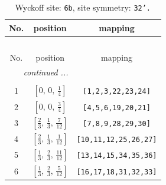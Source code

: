 \documentclass[fleqn,8pt]{jsarticle}
\begin{document}
\begin{longtable}{ccc}
\caption{Wyckoff site: {\tt 6b}, site symmetry: {\tt 32'.}}
 \\
 \hline \hline
No. & position & mapping \\ \hline \endfirsthead

\multicolumn{2}{l}{\tablename\ \thetable{}} \\
 \hline \hline
No. & position & mapping \\ \hline \endhead

 \hline \hline
\multicolumn{2}{r}{\footnotesize\it continued ...} \\ \endfoot

 \hline \hline
\multicolumn{2}{r}{} \\ \endlastfoot

1 & $\left[ 0,\, 0,\, \frac{1}{4} \right]$ & {\tt [1,2,3,22,23,24]} \\ \hline
2 & $\left[ 0,\, 0,\, \frac{3}{4} \right]$ & {\tt [4,5,6,19,20,21]} \\ \hline
3 & $\left[ \frac{2}{3},\, \frac{1}{3},\, \frac{7}{12} \right]$ & {\tt [7,8,9,28,29,30]} \\ \hline
4 & $\left[ \frac{2}{3},\, \frac{1}{3},\, \frac{1}{12} \right]$ & {\tt [10,11,12,25,26,27]} \\ \hline
5 & $\left[ \frac{1}{3},\, \frac{2}{3},\, \frac{11}{12} \right]$ & {\tt [13,14,15,34,35,36]} \\ \hline
6 & $\left[ \frac{1}{3},\, \frac{2}{3},\, \frac{5}{12} \right]$ & {\tt [16,17,18,31,32,33]} \\
\end{longtable}
\renewcommand{\arraystretch}{1.2}
\end{document}
